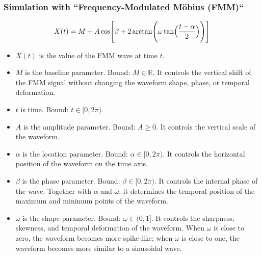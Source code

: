 \documentclass[a4paper]{article}
\begin{document}
         \subsubsection{Simulation with ``Frequency-Modulated Möbius (FMM)``}


            \begin{equation}
               X(t)
               =
               M
               +
               A
               \cos
               \Biggl[
               \beta
               +
               2
               \arctan
               \Biggl(
               \omega
               \tan
               \Bigl(
               \frac{t-\alpha}{2}
               \Bigr)
               \Biggr)
               \Biggr]
            \end{equation}

            \begin{itemize}
               \item $X(t)$ is the value of the FMM wave at time $t$.

               \item $M$ is the baseline parameter. Bound: $M \in \mathbb{R}$.
               It controls the vertical shift of the FMM signal without changing
               the waveform shape, phase, or temporal deformation.

               \item $t$ is time. Bound: $t \in [0, 2\pi)$.

               \item $A$ is the amplitude parameter. Bound: $A \geq 0$.
               It controls the vertical scale of the waveform.

               \item $\alpha$ is the location parameter. Bound:
               $\alpha \in [0, 2\pi)$. It controls the horizontal position of
               the waveform on the time axis.

               \item $\beta$ is the phase parameter. Bound:
               $\beta \in [0, 2\pi)$. It controls the internal phase of the wave.
               Together with $\alpha$ and $\omega$, it determines the temporal
               position of the maximum and minimum points of the waveform.

               \item $\omega$ is the shape parameter. Bound:
               $\omega \in (0, 1]$. It controls the sharpness, skewness, and
               temporal deformation of the waveform. When $\omega$ is close to
               zero, the waveform becomes more spike-like; when $\omega$ is close
               to one, the waveform becomes more similar to a sinusoidal wave.
            \end{itemize}
\end{document}
